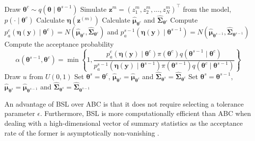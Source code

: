 \begin{algorithm}
	\caption{Bayesian synthetic likelihood}\label{BSL0}
	\begin{algorithmic}[1]
			\State Draw $\boldsymbol{\theta}^c\sim q(\boldsymbol{\theta}\mid \boldsymbol{\theta}^{s-1})$
				\State Simulate ${\boldsymbol z}^{m}=(z_{1}^{m},z_{2}^{m},...,z_{N}^{m})^{\top}$ from the model, $p(\cdot\mid{\boldsymbol{\theta} }^c)$
				\State Calculate $\boldsymbol{\eta}(\boldsymbol{z}^{(m)})$
			\EndFor 			 
			\State Calculate $\hat{\boldsymbol{\mu}}_{\boldsymbol{\theta}^c}$ and $\hat{\boldsymbol{\Sigma}}_{\boldsymbol{\theta}^c}$
			\State Compute $p_a^c(\boldsymbol{\eta}(\boldsymbol{y})\mid \boldsymbol{\theta}^c) = N(\hat{\boldsymbol{\mu}}_{\boldsymbol{\theta}^c}, \hat{\boldsymbol{\Sigma}}_{\boldsymbol{\theta}^c})$ and $p_a^{s-1}(\boldsymbol{\eta}(\boldsymbol{y})\mid \boldsymbol{\theta}^{s-1}) = N(\hat{\boldsymbol{\mu}}_{\boldsymbol{\theta}^{s-1}}, \hat{\boldsymbol{\Sigma}}_{\boldsymbol{\theta}^{s-1}})$
			\State Compute the acceptance probability
			$$\alpha(\boldsymbol{\theta}^{s-1},\boldsymbol{\theta}^c)=\min\left\{1,\frac{p_a^c(\boldsymbol{\eta}(\boldsymbol{y})\mid \boldsymbol{\theta}^c)\pi(\boldsymbol{\theta}^c)q(\boldsymbol{\theta}^{s-1}\mid \boldsymbol{\theta}^{c})}{p_a^{s-1}(\boldsymbol{\eta}(\boldsymbol{y})\mid \boldsymbol{\theta}^{s-1})\pi(\boldsymbol{\theta}^{s-1})q(\boldsymbol{\theta}^{c}\mid \boldsymbol{\theta}^{s-1})}\right\}$$
			\State Draw $u$ from $U(0,1)$
				\State Set $\boldsymbol{\theta}^{s}=\boldsymbol{\theta}^{c}$, $\hat{\boldsymbol{\mu}}_{\boldsymbol{\theta}^{s}}=\hat{\boldsymbol{\mu}}_{\boldsymbol{\theta}^c}$ and $\hat{\boldsymbol{\Sigma}}_{\boldsymbol{\theta}^s}=\hat{\boldsymbol{\Sigma}}_{\boldsymbol{\theta}^c}$
			\Else
				\State Set $\boldsymbol{\theta}^{s}=\boldsymbol{\theta}^{s-1}$, $\hat{\boldsymbol{\mu}}_{\boldsymbol{\theta}^{s}}=\hat{\boldsymbol{\mu}}_{\boldsymbol{\theta}^{s-1}}$ and $\hat{\boldsymbol{\Sigma}}_{\boldsymbol{\theta}^s}=\hat{\boldsymbol{\Sigma}}_{\boldsymbol{\theta}^{s-1}}$
			\EndIf  
		\EndFor
	\end{algorithmic}
\end{algorithm}

An advantage of BSL over ABC is that it does not require selecting a tolerance parameter $\epsilon$. Furthermore, BSL is more computationally efficient than ABC when dealing with a high-dimensional vector of summary statistics as the acceptance rate of the former is asymptotically non-vanishing \cite{nott2023bayesian}.  

